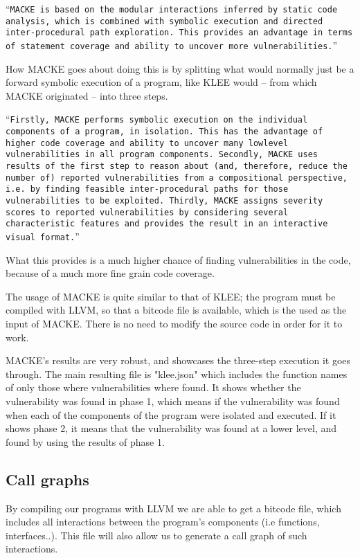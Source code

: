 \enquote{\texttt{MACKE is based on the modular interactions inferred
		by static code analysis, which is combined with symbolic execution
		and directed inter-procedural path exploration. This
		provides an advantage in terms of statement coverage and
		ability to uncover more vulnerabilities.}}\parencite{ognawala}
	
How MACKE goes about doing this is by splitting what would normally just be a forward symbolic execution of a program, like KLEE would -- from which MACKE originated -- into three steps.

\enquote{\texttt{Firstly,
		MACKE performs symbolic execution on the individual components
		of a program, in isolation. This has the advantage
		of higher code coverage and ability to uncover many lowlevel
		vulnerabilities in all program components. Secondly,
		MACKE uses results of the first step to reason about (and,
		therefore, reduce the number of) reported vulnerabilities
		from a compositional perspective, i.e. by finding feasible
		inter-procedural paths for those vulnerabilities to be exploited.
		Thirdly, MACKE assigns severity scores to reported
		vulnerabilities by considering several characteristic features
		and provides the result in an interactive visual format.}}\parencite{ognawala}
	
What this provides is a much higher chance of finding vulnerabilities in the code, because of a much more fine grain code coverage.

The usage of MACKE is quite similar to that of KLEE; the program must be compiled with LLVM, so that a bitcode file is available, which is the used as the input of MACKE. There is no need to modify the source code in order for it to work.

MACKE's results are very robust, and showcases the three-step execution it goes through. The main resulting file is "klee.json" which includes the function names of only those where vulnerabilities where found. 
It shows whether the vulnerability was found in phase 1, which means if the vulnerability was found when each of the components of the program were isolated and executed. If it shows phase 2, it means that the vulnerability was found at a lower level, and found by using the results of phase 1. 

\subsection{Call graphs}

By compiling our programs with LLVM we are able to get a bitcode file, which includes all interactions between the program's components (i.e functions, interfaces..). This file will also allow us to generate a call graph of such interactions.

